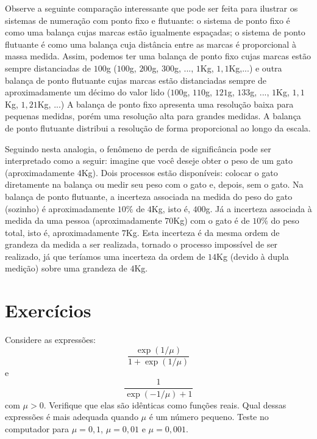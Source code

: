 \documentclass[main.tex]{subfiles}
\begin{document}
\begin{ex} Observe a seguinte comparação interessante que pode ser feita para ilustrar os sistemas de numeração com ponto fixo e flutuante: o sistema de ponto fixo é como uma balança cujas marcas estão igualmente espaçadas; o sistema de ponto flutuante é como uma balança cuja distância entre as marcas é proporcional à massa medida. Assim, podemos ter uma balança de ponto fixo cujas marcas estão sempre distanciadas de $100$g ($100$g, $200$g, $300$g, ..., $1$Kg, $1,1$Kg,...) e outra balança de ponto flutuante cujas marcas estão distanciadas sempre de aproximadamente um décimo do valor lido ($100$g, $110$g, $121$g, $133$g, ..., $1$Kg, $1,1$Kg, $1,21$Kg, ...) A balança de ponto fixo apresenta uma resolução baixa para pequenas medidas, porém uma resolução alta para grandes medidas. A balança de ponto flutuante distribui a resolução de forma proporcional ao longo da escala.    

Seguindo nesta analogia, o fenômeno de perda de significância pode ser interpretado como a seguir: imagine que você deseje obter o peso de um gato (aproximadamente $4$Kg). Dois processos estão disponíveis: colocar o gato diretamente na balança ou medir seu peso com o gato e, depois, sem o gato. Na balança de ponto flutuante, a incerteza associada na medida do peso do gato (sozinho) é aproximadamente $10\%$ de $4$Kg, isto é, $400$g. Já a incerteza associada à medida da uma pessoa (aproximadamente $70$Kg) com o gato é de $10\%$ do peso total, isto é, aproximadamente $7$Kg. Esta incerteza é da mesma ordem de grandeza da medida a ser realizada, tornado o processo impossível de ser realizado, já que teríamos uma incerteza da ordem de $14$Kg (devido à dupla medição) sobre uma grandeza de $4$Kg.    
\end{ex}

\section*{Exercícios}

\begin{Exercise} Considere as expressões:
  \begin{equation*}
    \frac{\exp(1/\mu)}{1+\exp(1/\mu)}  
  \end{equation*}
e
\begin{equation*}
  \frac{1}{\exp(-1/\mu)+1}
\end{equation*}
com $\mu>0$. Verifique que elas são idênticas como funções reais. Qual dessas expressões é mais adequada quando $\mu$ é um número pequeno. Teste no computador para $\mu=0,1$, $\mu=0,01$ e $\mu=0,001$.
\end{Exercise}
\end{document}
